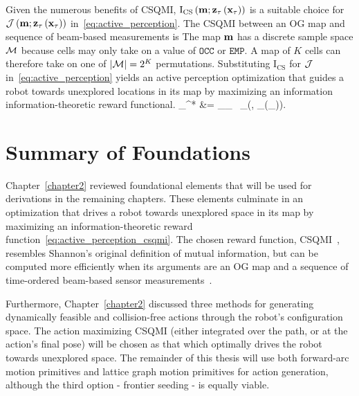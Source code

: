 Given the numerous benefits of CSQMI, $\text{I}_{\text{CS}}\left(\mathbf{m};\mathbf{z}_{\mathbf{\tau}}\left(\mathbf{x}_{\mathbf{\tau}}\right)\right)$
is a suitable choice
for $\mathcal{J}\left(\mathbf{m}; \mathbf{z}_{\mathbf{\tau}}\left(\mathbf{x}_{\mathbf{\tau}}\right)\right)$
in~\eqref{eq:active_perception}. The CSQMI between an OG map and sequence of
beam-based measurements is
%
%
The map $\mathbf{m}$ has a discrete sample space $\mathcal{M}$ because cells may
only take on a value of $\texttt{OCC}$ or $\texttt{EMP}$. A map of $K$ cells
can therefore take on one of $\vert \mathcal{M} \vert = 2^{K}$ permutations.
Substituting $\text{I}_{\text{CS}}$ for $\mathcal{J}$ in~\eqref{eq:active_perception}
yields an active perception optimization that guides a robot towards unexplored
locations in its map by maximizing an information information-theoretic reward functional.
%
\eq
{
 _{\mbf{\tau}}^{*}
 &=
 \argmax_{_{\mbf{\tau}} \in {}}
 \
 _{}\left(,
 _{\mbf{\tau}}(_{\mbf{\tau}})\right).
 \label{eq:active_perception_csqmi}
}

\section{Summary of Foundations}

Chapter~\ref{chapter2} reviewed foundational elements that will be used for
derivations in the remaining chapters. These elements culminate in an
optimization that drives a robot towards unexplored space in its map by
maximizing an information-theoretic reward
function~\eqref{eq:active_perception_csqmi}. The chosen reward function,
CSQMI~\cite{principe2010information},
resembles Shannon's original definition of mutual information, but can be computed
more efficiently when its arguments are an OG map and a sequence
of time-ordered beam-based sensor measurements~\cite{charrow2015icra}.

Furthermore, Chapter~\ref{chapter2} discussed three methods for generating
dynamically feasible and collision-free actions through the robot's
configuration space. The action maximizing CSQMI (either integrated over the
path, or at the action's final pose) will be chosen as that which optimally
drives the robot towards unexplored space. The remainder of this thesis will use both forward-arc
motion primitives and lattice graph motion primitives for action generation,
although the third option - frontier seeding - is equally viable.
